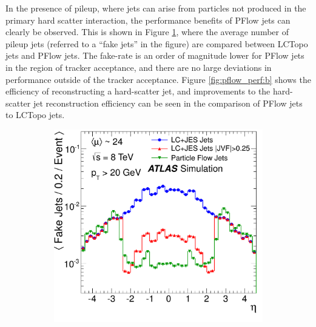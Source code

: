 In the presence of pileup, where jets can arise from particles not produced in the primary hard scatter interaction, the performance benefits of PFlow jets can clearly be observed. This is shown in Figure \ref{fig:pflow_perf:a}, where the average number of pileup jets (referred to a ``fake jets'' in the figure) are compared between LCTopo jets and PFlow jets. The fake-rate is an order of magnitude lower for PFlow jets in the region of tracker acceptance, and there are no large deviations in performance outside of the tracker acceptance. Figure \ref{fig:pflow_perf:b} shows the efficiency of reconstructing a hard-scatter jet, and improvements to the hard-scatter jet reconstruction efficiency can be seen in the comparison of PFlow jets to LCTopo jets. 
\begin{figure}[t]
\centering
\begin{subfigure}[b]{0.46\textwidth}
    \centering
    \includegraphics[width=\textwidth]{plots/atlas/pflow_performance_a.pdf}
    \caption{}
    \label{fig:pflow_perf:a}
\end{subfigure}
\hfill
\begin{subfigure}[b]{0.46\textwidth}
    \centering

\end{subfigure}
\end{figure}
